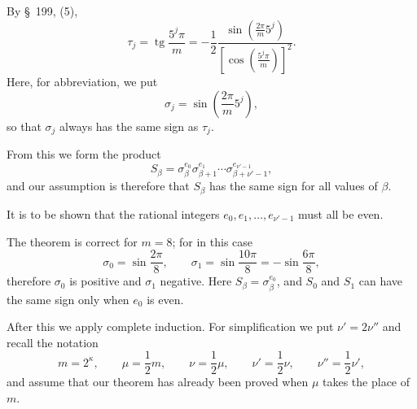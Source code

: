 \documentclass[11pt]{article}
\newcommand{\tg}{\operatorname{tg}}
\begin{document}
By \S~199, (5),
\[
\tau_j=\tg\frac{5^j\pi}{m}=-\frac12\frac{\sin\left(\frac{2\pi}{m}5^j\right)}{\left[\cos\left(\frac{5^j\pi}{m}\right)\right]^2}.
\]
Here, for abbreviation, we put
\begin{equation}
\sigma_j=\sin\left(\frac{2\pi}{m}5^j\right),
\tag{14}
\end{equation}
so that $\sigma_j$ always has the same sign as $\tau_j$.

From this we form the product
\begin{equation}
S_\beta=\sigma_\beta^{e_0}\sigma_{\beta+1}^{e_1}\cdots\sigma_{\beta+\nu'-1}^{e_{\nu'-1}},
\tag{15}
\end{equation}
and our assumption is therefore that $S_\beta$ has the same sign for all values of $\beta$.

It is to be shown that the rational integers $e_0,e_1,\ldots,e_{\nu'-1}$ must all be even.

The theorem is correct for $m=8$; for in this case
\[
\sigma_0=\sin\frac{2\pi}{8},\qquad \sigma_1=\sin\frac{10\pi}{8}=-\sin\frac{6\pi}{8},
\]
therefore $\sigma_0$ is positive and $\sigma_1$ negative. Here $S_\beta=\sigma_\beta^{e_0}$, and $S_0$ and $S_1$ can have the same sign only when $e_0$ is even.

After this we apply complete induction. For simplification we put $\nu'=2\nu''$ and recall the notation
\begin{equation}
m=2^\kappa,\qquad \mu=\frac12m,\qquad \nu=\frac12\mu,
\qquad \nu'=\frac12\nu,
\qquad \nu''=\frac12\nu',
\tag{16}
\end{equation}
and assume that our theorem has already been proved when $\mu$ takes the place of $m$.
\end{document}
